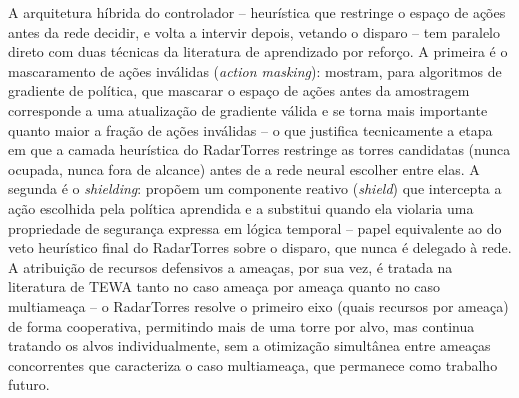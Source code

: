 \documentclass[12pt,a4paper]{article}
\begin{document}
A arquitetura híbrida do controlador -- heurística que restringe o espaço de ações antes da rede
decidir, e volta a intervir depois, vetando o disparo -- tem paralelo direto com duas técnicas da
literatura de aprendizado por reforço. A primeira é o mascaramento de ações inválidas
(\textit{action masking}):  mostram, para algoritmos de
gradiente de política, que mascarar o espaço de ações antes da amostragem corresponde a uma
atualização de gradiente válida e se torna mais importante quanto maior a fração de ações
inválidas -- o que justifica tecnicamente a etapa em que a camada heurística do RadarTorres
restringe as torres candidatas (nunca ocupada, nunca fora de alcance) antes de a rede neural
escolher entre elas. A segunda é o \textit{shielding}:  propõem
um componente reativo (\textit{shield}) que intercepta a ação escolhida pela política aprendida e a
substitui quando ela violaria uma propriedade de segurança expressa em lógica temporal -- papel
equivalente ao do veto heurístico final do RadarTorres sobre o disparo, que nunca é delegado à
rede. A atribuição de recursos defensivos a ameaças, por sua vez, é tratada na literatura de TEWA
tanto no caso ameaça por ameaça quanto no caso multiameaça \cite{tewa2009,tewa_multiameaca2009} --
o RadarTorres resolve o primeiro eixo (quais recursos por ameaça) de forma cooperativa, permitindo
mais de uma torre por alvo, mas continua tratando os alvos individualmente, sem a otimização
simultânea entre ameaças concorrentes que caracteriza o caso multiameaça, que permanece como
trabalho futuro.
\end{document}
